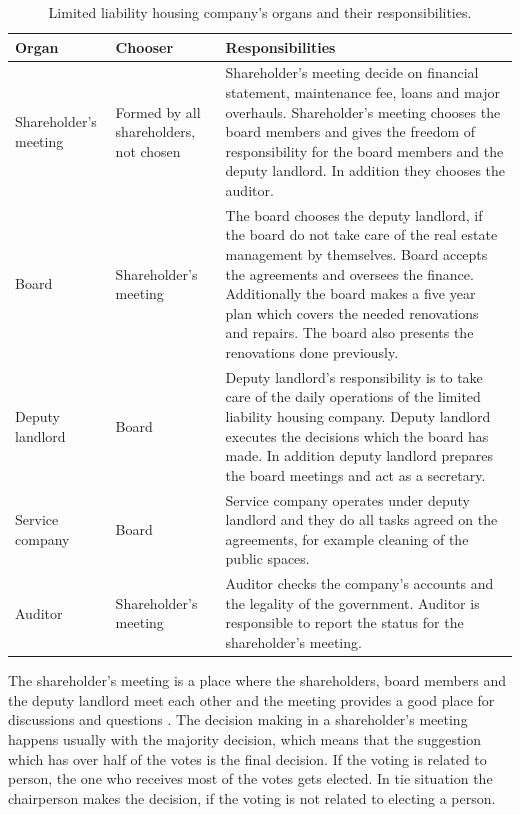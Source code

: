 \begin{table}
\begin{tabular}{|p{2.5cm}|p{2.5cm}|p{6.4cm}|} 
\hline %
\textbf{Organ} & \textbf{Chooser}  & \textbf{Responsibilities} \\ 
\hline 
Shareholder's meeting & Formed by all shareholders, not chosen & Shareholder's meeting decide on financial statement, maintenance fee, loans and major overhauls. Shareholder's meeting chooses the board members and gives the freedom of responsibility for the board members and the deputy landlord. In addition they chooses the auditor.\\ 
\hline
Board & Shareholder's meeting & The board chooses the deputy landlord, if the board do not take care of the real estate management by themselves. Board accepts the agreements and oversees the finance. Additionally the board makes a five year plan which covers the needed renovations and repairs. The board also presents the renovations done previously.\\
\hline
Deputy landlord & Board & Deputy landlord's responsibility is to take care of the daily operations of the limited liability housing company. Deputy landlord executes the decisions which the board has made. In addition deputy landlord prepares the board meetings and act as a secretary.\\
\hline
Service company & Board & Service company operates under deputy landlord and they do all tasks agreed on the agreements, for example cleaning of the public spaces.\\
\hline
Auditor & Shareholder's meeting & Auditor checks the company's accounts and the legality of the government. Auditor is responsible to report the status for the shareholder's meeting.\\
\hline
\end{tabular} %
\caption{Limited liability housing company's organs and their responsibilities. \parencite{RantanenViiala:2015}}
\label{table:responsibilities}
\end{table} %

The shareholder's meeting is a place where the shareholders, board members and the deputy landlord meet each other and the meeting provides a good place for discussions and questions \parencite{Hallintotapa:2017}. The decision making in a shareholder's meeting happens usually with the majority decision, which means that the suggestion which has over half of the votes is the final decision. If the voting is related to person, the one who receives most of the votes gets elected. In tie situation the chairperson makes the decision, if the voting is not related to electing a person. \parencite{RantanenViiala:2015}

